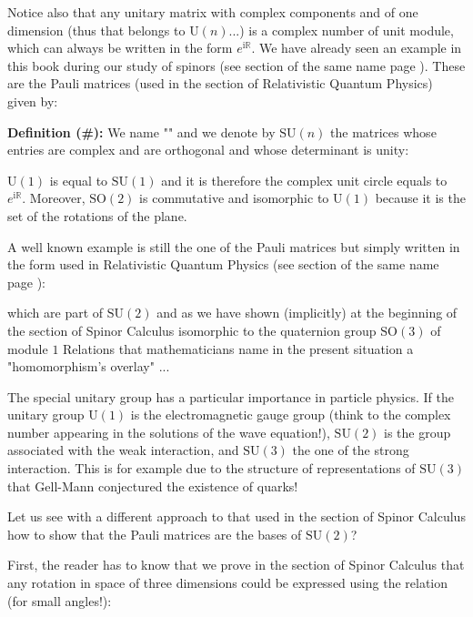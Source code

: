 	Notice also that any unitary matrix with complex components and of one dimension  (thus that belongs to $\text{U}(n)$...) is a complex number of unit module, which can always be written in the form $e^{\mathrm{i}\mathbb{R}}$.
	We have already seen an example in this book during our study of spinors (see section of the same name page \pageref{spinors}). These are the Pauli matrices (used in the section of Relativistic Quantum Physics) given by:
	
	\textbf{Definition (\#\mydef):} We name "\label{special unitary group}" and we denote by $\text{SU} (n)$ the matrices whose entries are complex and are orthogonal and whose determinant is unity:
	
	\begin{tcolorbox}[title=Remark,colframe=black,arc=10pt]
	$\text{U}(1)$ is equal to $\text{SU}(1)$ and it is therefore the complex unit circle equals to $e^{\mathrm{i}\mathbb{R}}$. Moreover, $\text{SO} (2)$ is commutative and isomorphic to $\text{U}(1)$ because it is the set of the rotations of the plane.
	\end{tcolorbox}
	A well known example is still the one of the Pauli matrices but simply written in the form used in Relativistic Quantum Physics (see section of the same name page \pageref{pauli matrices}):
	
	which are part of $\text{SU} (2)$ and as we have shown (implicitly) at the beginning of the section of Spinor Calculus isomorphic to the quaternion group $\text{SO} (3)$ of module $1$ Relations that mathematicians name in the present situation a "homomorphism's overlay" ...
	\begin{tcolorbox}[title=Remark,colframe=black,arc=10pt]
	The special unitary group has a particular importance in particle physics. If the unitary group $\text{U} (1)$ is the electromagnetic gauge group (think to the complex number appearing in the solutions of the wave equation!), $\text{SU} (2)$ is the group associated with the weak interaction, and $\text{SU} (3)$ the one of the strong interaction. This is for example due to the structure of representations of $\text{SU} (3)$ that Gell-Mann conjectured the existence of quarks!
	\end{tcolorbox}
	Let us see with a different approach to that used in the section of Spinor Calculus how to show that the Pauli matrices are the bases of $\text{SU} (2)$?
	
	First, the reader has to know that we prove in the section of Spinor Calculus  that any rotation in space of three dimensions could be expressed using the relation (for small angles!):
	
